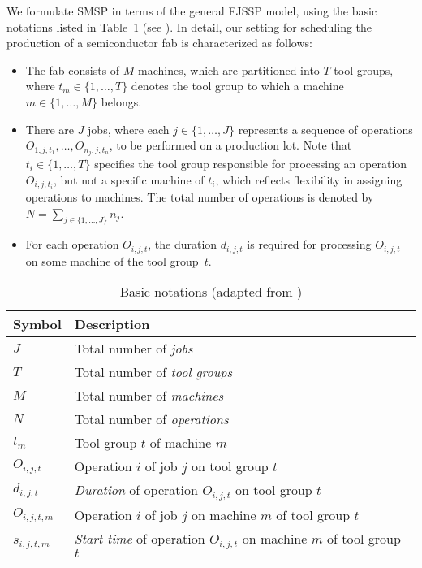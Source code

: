 We formulate SMSP in terms of the general FJSSP model,
using the basic notations listed in Table~\ref{notations} (see \cite{Ali2024}). 
In detail, our setting for scheduling the production of a semiconductor fab is characterized as follows:

\begin{itemize}
	\item The fab consists of $M$ machines, which are partitioned into $T$
	tool groups, where $t_m\in\{1,\dots,T\}$ denotes the tool group
	to which a machine $m\in\{1,\dots,M\}$ belongs.
	\item There are $J$ jobs, where each $j\in\{1,\dots,J\}$ represents a
	sequence of operations $O_{1,j,t_1},\dots,O_{n_j,j,t_n}$, to be performed on a production lot.
	Note that $t_i\in\{1,\dots,T\}$ specifies the tool group 
	responsible for processing an operation $O_{i,j,t_i}$, %
	but not a specific machine of $t_i$,
	which reflects flexibility in assigning operations to machines.
	The total number of operations is denoted by
	$N = \sum_{j\in\{1,\dots,J\}}n_j$.
	\item For each operation $O_{i,j,t}$,
	the duration $d_{i,j,t}$ is required for processing $O_{i,j,t}$
	on some machine of the tool group~$t$.
\end{itemize}%
%
\begin{table*}[t]
	\caption{Basic notations (adapted from \cite{Ali2024})}\label{notations} \centering
	\begin{tabular}{|l|l|}
		\hline
		Symbol & Description \\ \hline
		$J$ & Total number of \emph{jobs}        \\
		$T$ & Total number of \emph{tool groups} \\
		$M$ & Total number of \emph{machines}    \\
		$N$ & Total number of \emph{operations} \\
		$t_{m}$ & Tool group $t$ of machine $m$ \\
		$O_{i,j,t}$ & Operation $i$ of job $j$ on tool group $t$  \\
		$d_{i,j,t}$ & \emph{Duration} of operation $O_{i,j,t}$ on tool group $t$ \\
		$O_{i,j,t,m}$ & Operation $i$ of job $j$ on machine $m$ of tool group $t$  \\
		$s_{i,j,t,m}$ & \emph{Start time} of operation $O_{i,j,t}$ on machine $m$ of tool group $t$  \\
		\hline
	\end{tabular}
\end{table*}

